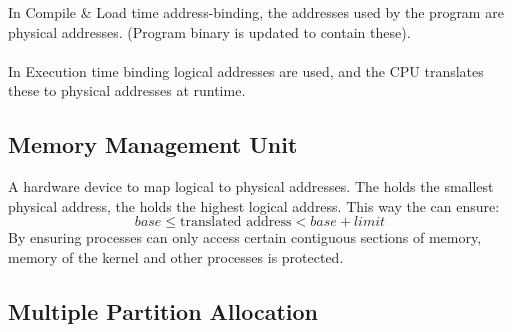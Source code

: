 \documentclass{report}
\begin{document}
            In Compile \& Load time address-binding, the addresses used by the program are physical addresses. (Program binary is updated to contain these).
            \\
            \\ In Execution time binding logical addresses are used, and the CPU translates these to physical addresses at runtime.
        
        \subsection*{Memory Management Unit}
            A hardware device to map logical to physical addresses.
            The  holds the smallest physical address, the  holds the highest logical address. This way the  can ensure:
            \[base \leq \text{translated address} < base + limit\]
            By ensuring processes can only access certain contiguous sections of memory, memory of the kernel and other processes is protected.
        
        \subsection*{Multiple Partition Allocation}
            \begin{itemize}
            \end{itemize}
        
\end{document}
